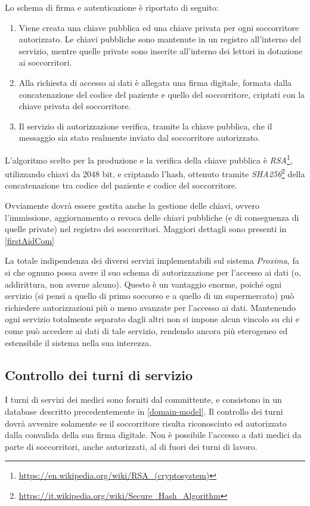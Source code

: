 \documentclass[a4paper,12pt]{report}
\begin{document}
Lo schema di firma e autenticazione è riportato di seguito:
\begin{enumerate}
	\item Viene creata una chiave pubblica ed una chiave privata per ogni soccorritore autorizzato. Le chiavi pubbliche sono mantenute in un registro all'interno del servizio, mentre quelle private sono inserite all'interno dei lettori in dotazione ai soccorritori.
	\item Alla richiesta di accesso ai dati è allegata una firma digitale, formata dalla concatenazione del codice del paziente e quello del soccorritore, criptati con la chiave privata del soccorritore.
	\item Il servizio di autorizzazione verifica, tramite la chiave pubblica, che il messaggio sia stato realmente inviato dal soccorritore autorizzato.
\end{enumerate}
L'algoritmo scelto per la produzione e la verifica della chiave pubblica è \emph{RSA}\footnote{\url{https://en.wikipedia.org/wiki/RSA_(cryptosystem)}}, utilizzando chiavi da 2048 bit, e criptando l'hash, ottenuto tramite \emph{SHA256}\footnote{\url{https://it.wikipedia.org/wiki/Secure_Hash_Algorithm}} della concatenazione tra codice del paziente e codice del soccorritore. 

Ovviamente dovrà essere gestita anche la gestione delle chiavi, ovvero l'immissione, aggiornamento o revoca delle chiavi pubbliche (e di conseguenza di quelle private) nel registro dei soccorritori. Maggiori dettagli sono presenti in \autoref{firstAidCom}

La totale indipendenza dei diversi servizi implementabili sul sistema \emph{Proxima}, fa si che ognuno possa avere il suo schema di autorizzazione per l'accesso ai dati (o, addirittura, non averne alcuno). Questo è un vantaggio enorme, poiché ogni servizio (si pensi a quello di primo soccorso e a quello di un supermercato) può richiedere autorizzazioni più o meno avanzate per l'accesso ai dati. Mantenendo ogni servizio totalmente separato dagli altri non si impone alcun vincolo su chi e come può accedere ai dati di tale servizio, rendendo ancora più eterogeneo ed estensibile il sistema nella sua interezza.

\subsection{Controllo dei turni di servizio}
I turni di servizi dei medici sono forniti dal committente, e consistono in un database descritto precedentemente in \autoref{domain-model}. Il controllo dei turni dovrà avvenire solamente se il soccorritore risulta riconosciuto ed autorizzato dalla convalida della sua firma digitale. Non è possibile l'accesso a dati medici da parte di soccorritori, anche autorizzati, al di fuori dei turni di lavoro. 
\end{document}
